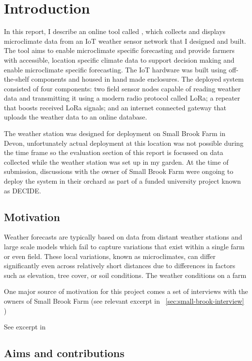 \section{Introduction}

In this report, I describe an online tool called \myReportTitle{}, which
collects and displays microclimate data from an IoT weather sensor network that
I designed and built. The tool aims to enable microclimate specific forecasting
and provide farmers with accessible, location specific climate data to support
decision making and enable microclimate specific forecasting. The IoT hardware
was built using off-the-shelf components and housed in hand made enclosures. The
deployed system consisted of four components: two field sensor nodes capable of
reading weather data and transmitting it using a modern radio protocol called
LoRa; a repeater that boosts received LoRa signals; and an internet connected
gateway that uploads the weather data to an online database. 

The weather station was designed for deployment on Small Brook Farm in Devon,
unfortunately actual deployment at this location was not possible during the
time frame so the evaluation section of this report is focussed on data
collected while the weather station was set up in my garden. At the time of
submission, discussions with the owner of Small Brook Farm were ongoing to
deploy the system in their orchard as part of a funded university project known
as DECIDE.

\subsection{Motivation}

Weather forecasts are typically based on data from distant weather stations and
large scale models which fail to capture variations that exist within a single
farm or even field. These local variations, known as microclimates, can differ
significantly even across relatively short distances due to differences in
factors such as elevation, tree cover, or soil conditions. The weather
conditions on a farm 

One major source of motivation for this project comes a set of interviews with the owners of Small Brook Farm (see relevant excerpt in ~\ref{sec:small-brook-interview} )

See excerpt in 



\subsection{Aims and contributions}

